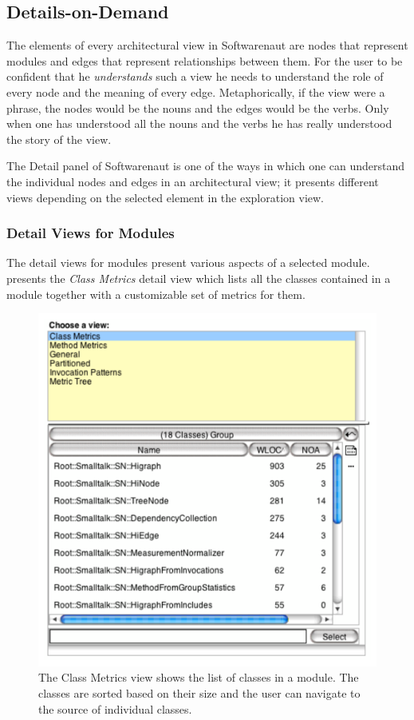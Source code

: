 \documentclass[preprint,12pt]{elsarticle}
\begin{document}
\subsection {Details-on-Demand} 

The elements of every architectural view in Softwarenaut are nodes that represent modules and edges that represent relationships between them. For the user to be confident that he {\em understands} such a view he needs to understand the role of every node and the meaning of every edge. Metaphorically, if the view were a phrase, the nodes would be the nouns and the edges would be the verbs. Only when one has understood all the nouns and the verbs he has really understood the story of the view.  

The Detail panel of Softwarenaut is one of the ways in which one can understand the individual nodes and edges in an architectural view; it presents different views depending on the selected element in the exploration view. 

\subsubsection {Detail Views for Modules}

The detail views for modules present various aspects of a selected module.  presents the {\em Class Metrics} detail view which lists all the classes contained in a module together with a customizable set of metrics for them.

\begin{figure}[ht]
\begin{center}
\includegraphics[width=0.55\linewidth]{DetailForNode}
\caption{The Class Metrics view shows the list of classes in a module. The classes are sorted based on their size and the user can navigate to the source of individual classes.}
\end{center}
\end{figure}
\end{document}

